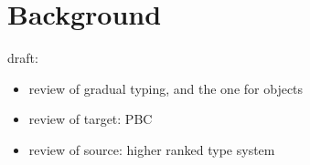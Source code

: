 \section{Background}
\label{sec:background}

draft:

\begin{itemize}
\item review of gradual typing, and the one for objects
\item review of target: PBC
\item review of source: higher ranked type system
\end{itemize}
